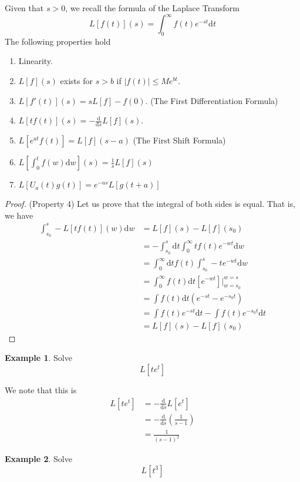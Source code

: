 \documentclass[11pt]{article}
\theoremstyle{plain} %
\theoremstyle{definition}
\theoremstyle{example}
\newtheorem*{example}{Example}
\theoremstyle{remark}
\begin{document}
Given that $s > 0$, we recall the formula of the Laplace Transform $$L\left[f(t)\right](s) = \int_0^{\infty}f(t)e^{-st}\mathrm d t$$
The following properties hold 
\begin{enumerate}
	\item Linearity.
	\item $L[f](s)$ exists for $s > b$ if $|f(t)| \leq Me^{bt}$.
	\item $L\left[f'(t)\right](s) = sL[f] - f(0)$. (The First Differentiation Formula)
	\item $L[tf(t)](s) = -\frac{\mathrm d }{\mathrm d s} L[f](s)$.
	\item $L\left[e^{at}f(t)\right] = L[f](s-a)$ (The First Shift Formula)
	\item $L\left[\int_0^t f(w) \mathrm d w\right](s) = \frac{1}{s}L[f](s)$
	\item $L\left[U_a(t)g(t)\right] = e^{-as}L\left[g(t+a)\right]$
\end{enumerate}

\begin{proof}(Property 4)
Let us prove that the integral of both sides is equal. That is, we have 
\begin{align*}
\int_{s_0}^s -L[tf(t)](w) \mathrm d w &= L[f](s) -L[f](s_0) \\
&= -\int_{s_0}^s \mathrm d t \int_0^{\infty} tf(t)e^{-wt} \mathrm d w \\
&= \int_0^{\infty} \mathrm d t f(t) \int_{s_0}^s -te^{-wt}\mathrm d w \\
&= \int_0^{\infty}f(t) \mathrm d t \left[e^{-wt}\right]|_{w=s_0}^{w=s} \\
&= \int f(t) \mathrm d t \left(e^{-st} -e^{-s_0t}\right) \\
&= \int f(t)e^{-st} \mathrm d t - \int f(t) e^{-s_0t} \mathrm d t \\
&= L[f](s) -L[f](s_0)
\end{align*}
\end{proof}

\begin{example}
Solve $$L\left[te^t\right]$$
\end{example}
We note that this is 
\begin{align*}L[te^t] &= -\frac{\mathrm d }{\mathrm d s} L\left[e^t\right] \\
&= -\frac{\mathrm d }{\mathrm d s} \left(\frac{1}{s-1}\right) \\
&= \frac{1}{(s-1)^2}
\end{align*}

\begin{example}
Solve $$L\left[t^3\right]$$
\end{example}
\end{document}
